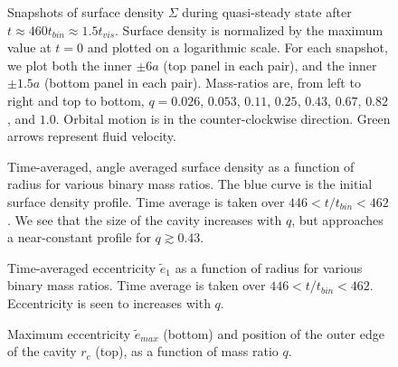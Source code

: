 \documentclass[apj]{emulateapj}
\begin{document}
\begin{figure}
\caption{Snapshots of surface density $\Sigma$ during quasi-steady state after $t \approx 460 t_{bin} \approx 1.5 t_{vis}$. Surface density is normalized by the maximum value at $t=0$ and plotted on a logarithmic scale. For each snapshot, we plot both the inner $\pm 6a$ (top panel in each pair), and the inner $\pm 1.5 a$ (bottom panel in each pair). Mass-ratios are, from left to right and top to bottom, $q=0.026$, $0.053$, $0.11$, $0.25$, $0.43$, $0.67$, $0.82$, and $1.0$. Orbital motion is in the counter-clockwise direction. Green arrows represent fluid velocity.}
\label{fig:dens2d}
\end{figure}

\begin{figure}
\caption{Time-averaged, angle averaged surface density as a function of radius for various binary mass ratios. The blue curve is the initial surface density profile. Time average is taken over $446 < t/t_{bin} < 462$. We see that the size of the cavity increases with $q$, but approaches a near-constant profile for $q \gtrsim 0.43$.
}
\label{fig:dens1d}
\end{figure}

\begin{figure}
\caption{Time-averaged eccentricity $\tilde{e}_1$ as a function of radius for various binary mass ratios. Time average is taken over $446 < t/t_{bin} < 462$. Eccentricity is seen to increases with $q$.}
\label{fig:eccentricity}
\end{figure}

\begin{figure}
\caption{Maximum eccentricity $\tilde{e}_{max}$ (bottom) and position of the outer edge of the cavity $r_c$ (top), as a function of mass ratio $q$.}
\label{fig:vs_q}
\end{figure}
\end{document}
